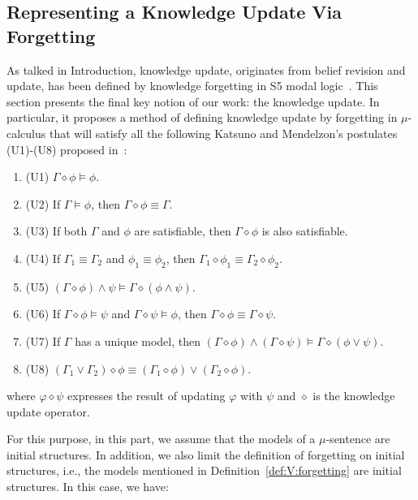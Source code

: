 \documentclass[runningheads]{llncs}
\begin{document}
\subsection{Representing a Knowledge Update Via Forgetting}\label{knowledge_updat}
As talked in Introduction, knowledge update, originates from belief revision and update, has been defined by knowledge forgetting in S5 modal logic~\cite{Zhang2009Knowledge}.
This section presents the final key notion of our work: the knowledge update.
In particular, it proposes a method of defining knowledge update by forgetting in $\mu$-calculus that will
satisfy all the following Katsuno and Mendelzon's postulates (U1)-(U8) proposed in~\cite{katsuno91mendelzon}:
\begin{enumerate}[]
    \item (U1)  $\Gamma \diamond \phi \models \phi$.
    \item (U2) If  $\Gamma \models \phi$,  then  $\Gamma \diamond \phi \equiv \Gamma$.
    \item (U3) If both $\Gamma$ and $\phi$ are satisfiable, then $\Gamma \diamond \phi$ is also satisfiable.
    \item (U4) If $\Gamma_1\equiv \Gamma_2$ and $\phi_1 \equiv \phi_2$, then $\Gamma_1 \diamond \phi_1 \equiv \Gamma_2 \diamond \phi_2$.
    \item (U5) $(\Gamma \diamond \phi) \wedge \psi \models \Gamma \diamond(\phi \wedge \psi)$.
    \item (U6) If $\Gamma \diamond \phi \models \psi$ and $\Gamma \diamond \psi \models \phi$, then $\Gamma \diamond \phi \equiv \Gamma \diamond \psi$.
    \item (U7) If $\Gamma$ has a unique model, then $(\Gamma \diamond \phi) \wedge (\Gamma \diamond \psi) \models \Gamma \diamond (\phi \vee \psi)$.
    \item (U8) $(\Gamma_1 \vee \Gamma_2) \diamond \phi \equiv (\Gamma_1 \diamond \phi) \vee  (\Gamma_2 \diamond \phi)$.
\end{enumerate}
where $\varphi \diamond \psi$ expresses the result of updating $\varphi$ with $\psi$ and $\diamond$ is the knowledge update operator.


For this purpose, in this part, we assume that the models of a $\mu$-sentence are initial structures.
In addition, we also limit the definition of forgetting on initial structures,
i.e., the models mentioned in Definition~\ref{def:V:forgetting} are initial structures. In this case, we have:
\end{document}
